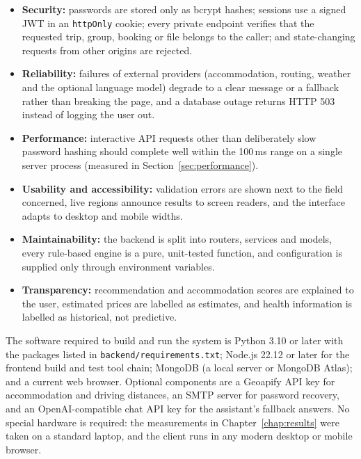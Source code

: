 \begin{itemize}
  \item \textbf{Security:} passwords are stored only as bcrypt hashes;
    sessions use a signed JWT in an \texttt{httpOnly} cookie; every private
    endpoint verifies that the requested trip, group, booking or file
    belongs to the caller; and state-changing requests from other origins
    are rejected.
  \item \textbf{Reliability:} failures of external providers (accommodation,
    routing, weather and the optional language model) degrade to a clear
    message or a fallback rather than breaking the page, and a database
    outage returns HTTP 503 instead of logging the user out.
  \item \textbf{Performance:} interactive API requests other than
    deliberately slow password hashing should complete well within the
    100\,ms range on a single server process (measured in
    Section~\ref{sec:performance}).
  \item \textbf{Usability and accessibility:} validation errors are shown
    next to the field concerned, live regions announce results to screen
    readers, and the interface adapts to desktop and mobile widths.
  \item \textbf{Maintainability:} the backend is split into routers,
    services and models, every rule-based engine is a pure, unit-tested
    function, and configuration is supplied only through environment
    variables.
  \item \textbf{Transparency:} recommendation and accommodation scores are
    explained to the user, estimated prices are labelled as estimates, and
    health information is labelled as historical, not predictive.
\end{itemize}

The software required to build and run the system is Python 3.10 or later
with the packages listed in \texttt{backend/requirements.txt}; Node.js
22.12 or later for the frontend build and test tool chain; MongoDB (a local
server or MongoDB Atlas); and a current web browser. Optional components are
a Geoapify API key for accommodation and driving distances, an SMTP server
for password recovery, and an OpenAI-compatible chat API key for the
assistant's fallback answers. No special hardware is required: the
measurements in Chapter~\ref{chap:results} were taken on a standard laptop,
and the client runs in any modern desktop or mobile browser.
